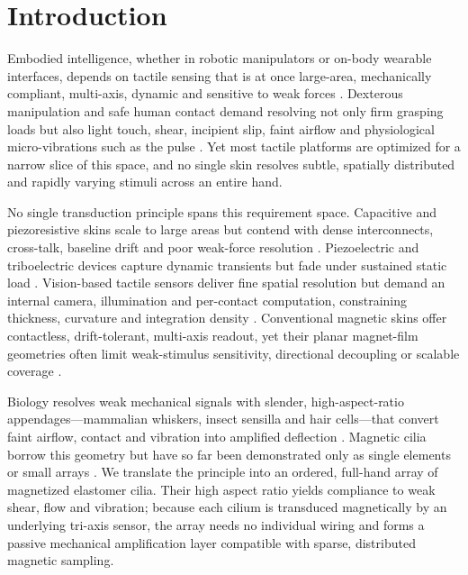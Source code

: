 \section*{Introduction}

Embodied intelligence, whether in robotic manipulators or on-body wearable
interfaces, depends on tactile sensing that is at once large-area, mechanically
compliant, multi-axis, dynamic and sensitive to weak forces
\cite{dahiya2010tactile,chortos2016pursuing}. Dexterous manipulation and safe
human contact demand resolving not only firm grasping loads but also light
touch, shear, incipient slip, faint airflow and physiological micro-vibrations
such as the pulse \cite{sundaram2019learning}. Yet most tactile platforms are
optimized for a narrow slice of this space, and no single skin resolves subtle,
spatially distributed and rapidly varying stimuli across an entire hand.

No single transduction principle spans this requirement space. Capacitive and
piezoresistive skins scale to large areas but contend with dense interconnects,
cross-talk, baseline drift and poor weak-force resolution
\cite{sundaram2019learning,boutry2018hierarchically}. Piezoelectric and
triboelectric devices capture dynamic transients but fade under sustained static
load . Vision-based tactile sensors deliver
fine spatial resolution but demand an internal camera, illumination and
per-contact computation, constraining thickness, curvature and integration
density \cite{yuan2017gelsight}. Conventional magnetic skins offer contactless,
drift-tolerant, multi-axis readout, yet their planar magnet-film geometries
often limit weak-stimulus sensitivity, directional decoupling or scalable
coverage \cite{hellebrekers2019soft,yan2021soft}.

Biology resolves weak mechanical signals with slender, high-aspect-ratio
appendages---mammalian whiskers, insect sensilla and hair cells---that convert
faint airflow, contact and vibration into amplified deflection
\cite{park2023bioinspired}. Magnetic cilia borrow this geometry but have so far
been demonstrated only as single elements or small arrays
\cite{alfadhel2015magnetic,man2023tactile}. We translate the principle into an
ordered, full-hand array of magnetized elastomer cilia. Their high aspect ratio
yields compliance to weak shear, flow and vibration; because each cilium is
transduced magnetically by an underlying tri-axis sensor, the array needs no
individual wiring and forms a passive mechanical amplification layer compatible
with sparse, distributed magnetic sampling.


